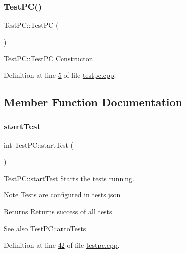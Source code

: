 \subsubsection{\texorpdfstring{Test\+P\+C()}{TestPC()}}
{\footnotesize\ttfamily Test\+P\+C\+::\+Test\+PC (\begin{DoxyParamCaption}{ }\end{DoxyParamCaption})}



\mbox{\hyperlink{class_test_p_c_a65226eb54f1ff76639c9fb1e2013e430}{Test\+P\+C\+::\+Test\+PC}} Constructor. 



Definition at line \mbox{\hyperlink{testpc_8cpp_source_l00005}{5}} of file \mbox{\hyperlink{testpc_8cpp_source}{testpc.\+cpp}}.



\subsection{Member Function Documentation}
\mbox{\label{class_test_p_c_ad0d724439a65d183d3d336b667cb867b}} 
\subsubsection{\texorpdfstring{start\+Test}{startTest}}
{\footnotesize\ttfamily int Test\+P\+C\+::start\+Test (\begin{DoxyParamCaption}{ }\end{DoxyParamCaption})\hspace{0.3cm}{\ttfamily [slot]}}



\mbox{\hyperlink{class_test_p_c_ad0d724439a65d183d3d336b667cb867b}{Test\+P\+C\+::start\+Test}} Starts the tests running. 

\begin{DoxyNote}{Note}
Tests are configured in \mbox{\hyperlink{tests_8json}{tests.\+json}}
\end{DoxyNote}
\begin{DoxyReturn}{Returns}
Returns success of all tests 
\end{DoxyReturn}
\begin{DoxySeeAlso}{See also}
Test\+P\+C\+::auto\+Tests 
\end{DoxySeeAlso}


Definition at line \mbox{\hyperlink{testpc_8cpp_source_l00042}{42}} of file \mbox{\hyperlink{testpc_8cpp_source}{testpc.\+cpp}}.

